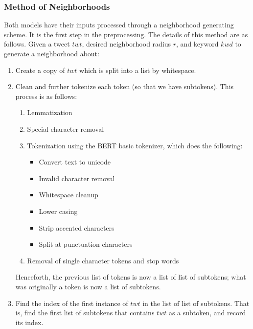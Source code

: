 \documentclass[12pt, a4paper]{article}
\begin{document}
\subsubsection{Method of Neighborhoods}
Both models have their inputs processed through a neighborhood generating scheme. It is the first step in the preprocessing. The details of this method are as follows. Given a tweet $twt$, desired neighborhood radius $r$, and keyword $kwd$ to generate a neighborhood about:
\newpage
\begin{enumerate}
    \item Create a copy of $twt$ which is split into a list by whitespace.
    \item Clean and further tokenize each token (so that we have subtokens). This process is as follows:
    \begin{enumerate}
        \item Lemmatization
        \item Special character removal
        \item Tokenization using the BERT basic tokenizer, which does the following:
        \begin{itemize}
            \item Convert text to unicode
            \item Invalid character removal
            \item Whitespace cleanup
            \item Lower casing
            \item Strip accented characters
            \item Split at punctuation characters
        \end{itemize}
        \item Removal of single character tokens and stop words
    \end{enumerate}
    Henceforth, the previous list of tokens is now a list of list of subtokens; what was originally a token is now a list of subtokens.
    
    \item Find the index of the first instance of $twt$ in the list of list of subtokens. That is, find the first list of subtokens that contains $twt$ as a subtoken, and record its index.


\end{enumerate}
\end{document}
